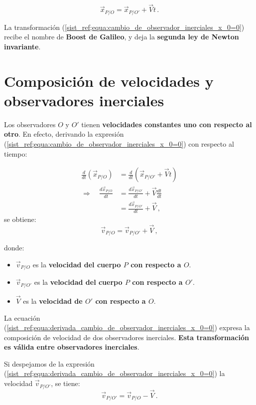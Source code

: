 \documentclass[../apunte_mecanica_clasica.tex]{subfiles}%
\begin{document}
\begin{equation}\label{sist_ref;equa:cambio_de_observador_inerciales_x_0=0}
    \vec{x}_{P/O} = \vec{x}_{P/O'} + \vec{V}t\,.
\end{equation}

La transformación (\ref{sist_ref;equa:cambio_de_observador_inerciales_x_0=0}) recibe el nombre de \textbf{Boost de Galileo}, y deja la \textbf{segunda ley de Newton invariante}.

\newpage

\section{Composición de velocidades y observadores inerciales}

Los observadores $O$ y $O'$ tienen \textbf{velocidades constantes uno con respecto al otro}. En efecto, derivando la expresión (\ref{sist_ref;equa:cambio_de_observador_inerciales_x_0=0}) con respecto al tiempo:


\begin{align*}
    \frac{d}{dt} \left(\vec{x}_{P/O}\right)&= \frac{d}{dt} \left(\vec{x}_{P/O'} + \vec{V}t \right) \\[4pt]
    \Rightarrow \quad \frac{d\vec{x}_{P/O}}{dt} &= \frac{d\vec{x}_{P/O'}}{dt} + \vec{V}\frac{d t}{dt} \\[4pt]
    &= \frac{d\vec{x}_{P/O'}}{dt} + \vec{V}\,,
\end{align*}    
se obtiene:
\begin{equation}\label{sist_ref;equa:derivada_cambio_de_observador_inerciales_x_0=0}
\vec{v}_{P/O} = \vec{v}_{P/O'} + \vec{V} \,,
\end{equation}

donde:
\begin{itemize}
    \item $\vec{v}_{P/O}$ es la \textbf{velocidad del cuerpo $P$ con respecto a $O$}.
    \item $\vec{v}_{P/O'}$ es la \textbf{velocidad del cuerpo $P$ con respecto a $O'$}.
    \item $\vec{V}$ es la \textbf{velocidad de $O'$ con respecto a $O$}.
\end{itemize}

La ecuación (\ref{sist_ref;equa:derivada_cambio_de_observador_inerciales_x_0=0}) expresa la composición de velocidad de dos observadores inerciales. \textbf{Esta transformación es válida entre observadores inerciales}. 

Si despejamos de la expresión (\ref{sist_ref;equa:derivada_cambio_de_observador_inerciales_x_0=0}) la velocidad $\vec{v}_{P/O'}$, se tiene:
\begin{equation}
    \vec{v}_{P/O'} = \vec{v}_{P/O} - \vec{V} \,.
\end{equation}
\end{document}
